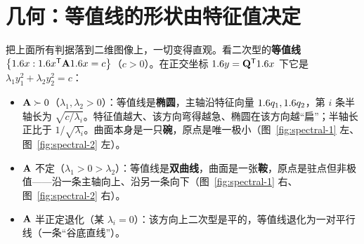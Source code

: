
\section{几何：等值线的形状由特征值决定}
\label{sec:spectral-5}

把上面所有判据落到二维图像上，一切变得直观。看二次型的\textbf{等值线} $\left\{1.6 x:1.6 x^{\mathsf{T}}\mathbf{A}1.6 x=c\right\}$（$c>0$）。在正交坐标 $1.6 y=\mathbf{Q}^{\mathsf{T}}1.6 x$ 下它是 $\lambda_1y_1^2+\lambda_2y_2^2=c$：

\begin{itemize}
    \item $\mathbf{A}\succ0$（$\lambda_1,\lambda_2>0$）：等值线是\textbf{椭圆}，主轴沿特征向量 $1.6 q_1,1.6 q_2$，第 $i$ 条半轴长为 $\sqrt{c/\lambda_i}$。特征值越大、该方向弯得越急、椭圆在该方向越``扁''；半轴长正比于 $1/\sqrt{\lambda_i}$。曲面本身是一只\textbf{碗}，原点是唯一极小（图~\ref{fig:spectral-1} 左、图~\ref{fig:spectral-2} 左）。
    \item $\mathbf{A}$ 不定（$\lambda_1>0>\lambda_2$）：等值线是\textbf{双曲线}，曲面是一张\textbf{鞍}，原点是驻点但非极值——沿一条主轴向上、沿另一条向下（图~\ref{fig:spectral-1} 右、图~\ref{fig:spectral-2} 右）。
    \item $\mathbf{A}$ 半正定退化（某 $\lambda_i=0$）：该方向上二次型是平的，等值线退化为一对平行线（一条``谷底直线''）。
\end{itemize}


